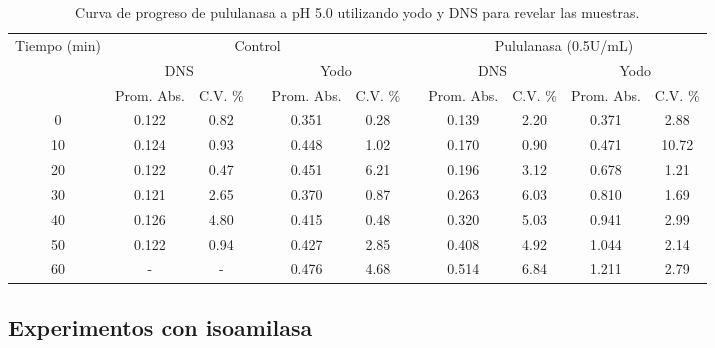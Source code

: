 \documentclass{article}
\begin{document}
\begin{table}[H]
	\centering
	\caption{Curva de progreso de pululanasa a pH 5.0 utilizando yodo y DNS para revelar las muestras.}
	\begin{adjustbox}{width=\textwidth}
	\begin{tabular}{ccccccccccc}
		\toprule
		\multirow{3}[6]{*}{Tiempo (min)} & \multicolumn{5}{c}{Control}           &       & \multicolumn{4}{c}{Pululanasa (0.5U/mL)} \\
		\cmidrule{2-6}\cmidrule{8-11}          & \multicolumn{2}{c}{DNS} &       & \multicolumn{2}{c}{Yodo} &       & \multicolumn{2}{c}{DNS} & \multicolumn{2}{c}{Yodo} \\
		\cmidrule{2-3}\cmidrule{5-6}\cmidrule{8-11}          & Prom. Abs. & C.V. \% &       & Prom. Abs. & C.V. \% &       & Prom. Abs. & C.V. \% & Prom. Abs. & C.V. \% \\
		\midrule
		0     & 0.122 & 0.82  &       & 0.351 & 0.28  &       & 0.139 & 2.20  & 0.371 & 2.88 \\
		10    & 0.124 & 0.93  &       & 0.448 & 1.02  &       & 0.170 & 0.90  & 0.471 & 10.72 \\
		20    & 0.122 & 0.47  &       & 0.451 & 6.21  &       & 0.196 & 3.12  & 0.678 & 1.21 \\
		30    & 0.121 & 2.65  &       & 0.370 & 0.87  &       & 0.263 & 6.03  & 0.810 & 1.69 \\
		40    & 0.126 & 4.80  &       & 0.415 & 0.48  &       & 0.320 & 5.03  & 0.941 & 2.99 \\
		50    & 0.122 & 0.94  &       & 0.427 & 2.85  &       & 0.408 & 4.92  & 1.044 & 2.14 \\
		60    & -     & -     &       & 0.476 & 4.68  &       & 0.514 & 6.84  & 1.211 & 2.79 \\
		\bottomrule
	\end{tabular}%
	\end{adjustbox}
	\label{tab:b5}%
\end{table}%

\subsection{Experimentos con isoamilasa}
\end{document}
